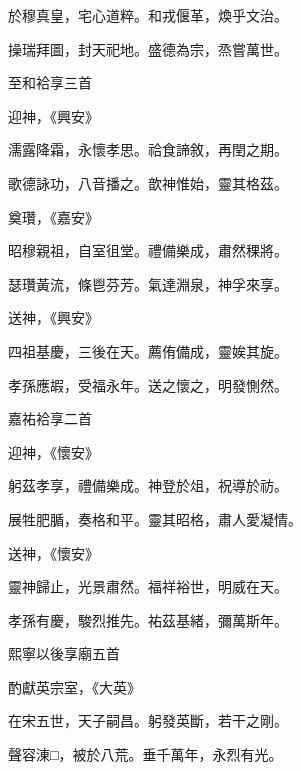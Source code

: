 \begin{pinyinscope}
 於穆真皇，宅心道粹。和戎偃革，煥乎文治。



 操瑞拜圖，封天祀地。盛德為宗，烝嘗萬世。



 至和袷享三首



 迎神，《興安》



 濡露降霜，永懷孝思。祫食諦敘，再閏之期。



 歌德詠功，八音播之。歆神惟始，靈其格茲。



 奠瓚，《嘉安》



 昭穆親祖，自室徂堂。禮備樂成，肅然稞將。



 瑟瓚黃流，條鬯芬芳。氣達淵泉，神孚來享。



 送神，《興安》



 四祖基慶，三後在天。薦侑備成，靈娭其旋。



 孝孫應嘏，受福永年。送之懷之，明發惻然。



 嘉祐袷享二首



 迎神，《懷安》



 躬茲孝享，禮備樂成。神登於俎，祝導於祊。



 展牲肥腯，奏格和平。靈其昭格，肅人愛凝情。



 送神，《懷安》



 靈神歸止，光景肅然。福祥裕世，明威在天。



 孝孫有慶，駿烈推先。祐茲基緒，彌萬斯年。



 熙寧以後享廟五首



 酌獻英宗室，《大英》



 在宋五世，天子嗣昌。躬發英斷，若干之剛。



 聲容涷□，被於八荒。垂千萬年，永烈有光。




\end{pinyinscope}
